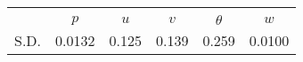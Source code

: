 \begin{tabular}{l*{1}{ccccc}}
\toprule
                &\multicolumn{5}{c}{}                             \\
                &$  p$&$ u $&$ v $&$ \theta $&$ w $\\
\midrule
S.D.              &   0.0132&    0.125&    0.139&    0.259&   0.0100\\
\bottomrule
\end{tabular}
